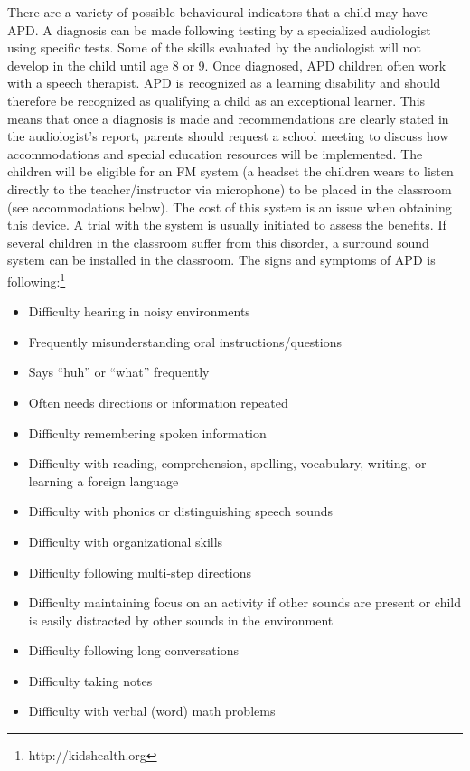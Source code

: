 \documentclass[letterpaper%
, twoside%
, 12pt%
,these%
, english%
,creativecommons,hyperref%
]{thETS}
\begin{document}
There are a variety of possible behavioural indicators that a child may have APD. A diagnosis
can be made following testing by a specialized audiologist using specific tests. Some of
the skills evaluated by the audiologist will not develop in the child until age 8 or 9. Once diagnosed,
APD children often work with a speech therapist. APD is recognized as a learning
disability and should therefore be recognized as qualifying a child as an exceptional learner.
This means that once a diagnosis is made and recommendations are clearly stated in the audiologist’s
report, parents should request a school meeting to discuss how accommodations
and special education resources will be implemented. The children will be eligible for an FM
system (a headset the children wears to listen directly to the teacher/instructor via microphone)
to be placed in the classroom (see accommodations below). The cost of this system is an issue
when obtaining this device. A trial with the system is usually initiated to assess the benefits.
If several children in the classroom suffer from this disorder, a surround sound system can be
installed in the classroom. The signs and symptoms of APD is following:\footnote{http://kidshealth.org}
\begin{itemize}
	\item Difficulty hearing in noisy environments
	\item Frequently misunderstanding oral instructions/questions
	\item Says “huh” or “what” frequently
	\item Often needs directions or information repeated
	\item Difficulty remembering spoken information
	\item Difficulty with reading, comprehension, spelling, vocabulary, writing, or learning a foreign	language
\item Difficulty with phonics or distinguishing speech sounds
\item Difficulty with organizational skills
	\item Difficulty following multi-step directions
	\item Difficulty maintaining focus on an activity if other sounds are present or child is easily
	distracted by other sounds in the environment
	\item Difficulty following long conversations
	\item Difficulty taking notes
	\item Difficulty with verbal (word) math problems
	 
\end{itemize}
\end{document}
